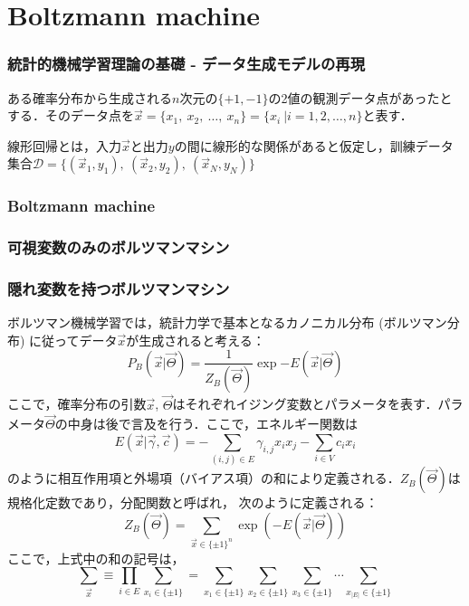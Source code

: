 \part{Boltzmann machine}

\section{統計的機械学習理論の基礎 - データ生成モデルの再現}
ある確率分布から生成される$n$次元の$\{+1, -1\}$の2値の観測データ点があったとする．そのデータ点を$\vec{x} = \{x_1,\ x_2,\ \ldots,\ x_n\}=\{x_i\ |i=1,2,\ldots,n\}$と表す．

線形回帰とは，入力$\vec{x}$と出力$y$の間に線形的な関係があると仮定し，訓練データ集合$\mathcal{D}=\{(\vec{x}_1,y_1),\ (\vec{x}_2,y_2),\ (\vec{x}_N,y_N)\}$








\section{Boltzmann machine}
\section{可視変数のみのボルツマンマシン}
\section{隠れ変数を持つボルツマンマシン}
ボルツマン機械学習では，統計力学で基本となるカノニカル分布 (ボルツマン分布) に従ってデータ$\Vec{x}$が生成されると考える：
\begin{equation}
    P_B(\Vec{x}|\Vec{\Theta}) = \frac{1}{Z_B(\Vec{\Theta})}\exp{-E(\Vec{x}|\Vec{\Theta})}
\end{equation}
ここで，確率分布の引数$\Vec{x}$, $\Vec{\Theta}$はそれぞれイジング変数とパラメータを表す．パラメータ$\Vec{\Theta}$の中身は後で言及を行う．ここで，エネルギー関数は
\begin{equation}
    E(\Vec{x}|\Vec{\gamma},\Vec{c}) = -\sum_{(i,j)\in E}\gamma_{i,j} x_i x_j - \sum_{i \in V}c_ix_i
\end{equation}
のように相互作用項と外場項（バイアス項）の和により定義される．$Z_B(\vec{\Theta})$は規格化定数であり，分配関数と呼ばれ，
次のように定義される：
\begin{equation}
    Z_B(\vec{\Theta}) = \sum_{\Vec{x}\in\{\pm1\}^{n}} \exp{(-E(\Vec{x}|\Vec{\Theta}))}
\end{equation}
ここで，上式中の和の記号は，
\begin{equation}
    \sum_{\Vec{x}} \equiv \prod_{i\in E} \sum_{x_i\in\{\pm 1\}} 
    = \sum_{x_1\in\{\pm 1\}} \sum_{x_2\in\{\pm 1\}} \sum_{x_3\in\{\pm 1\}} 
    \cdots \sum_{x_|E|\in\{\pm 1\}} 
\end{equation}


